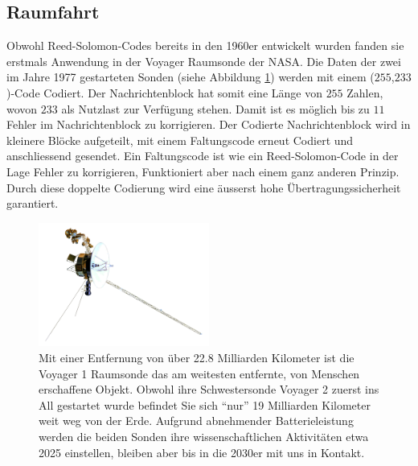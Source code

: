 \subsection{Raumfahrt}
Obwohl Reed-Solomon-Codes bereits in den 1960er entwickelt wurden fanden sie erstmals Anwendung in der Voyager Raumsonde der NASA. Die Daten der zwei im Jahre 1977 gestarteten Sonden (siehe Abbildung \ref{fig:voyager}) werden mit einem ($255$,$233$)-Code
Codiert. 
Der Nachrichtenblock hat somit eine Länge von $255$ Zahlen, wovon $233$ als Nutzlast zur Verfügung stehen.
Damit ist es möglich bis zu $11$ Fehler im Nachrichtenblock zu korrigieren. 
Der Codierte Nachrichtenblock wird in kleinere Blöcke aufgeteilt, mit einem Faltungscode erneut Codiert und anschliessend gesendet. Ein Faltungscode ist wie ein Reed-Solomon-Code in der Lage Fehler zu korrigieren, Funktioniert aber nach einem ganz anderen Prinzip. 
Durch diese doppelte Codierung wird eine äusserst hohe Übertragungssicherheit garantiert.
%
%
%
%
%
%

\begin{figure}
	\centering
	\includegraphics[width=0.5\textwidth]{papers/reedsolomon/images/Voyager_Sonde}
	\caption{Mit einer Entfernung von über 22.8 Milliarden Kilometer ist die Voyager 1 Raumsonde das am weitesten entfernte, von Menschen erschaffene Objekt. Obwohl ihre Schwestersonde Voyager 2 zuerst ins All gestartet wurde befindet Sie sich ``nur'' 19 Milliarden Kilometer weit weg von der Erde. Aufgrund abnehmender Batterieleistung werden die beiden Sonden ihre wissenschaftlichen Aktivitäten etwa 2025 einstellen, bleiben aber bis in die 2030er mit uns in Kontakt.}
	\label{fig:voyager}
\end{figure}

